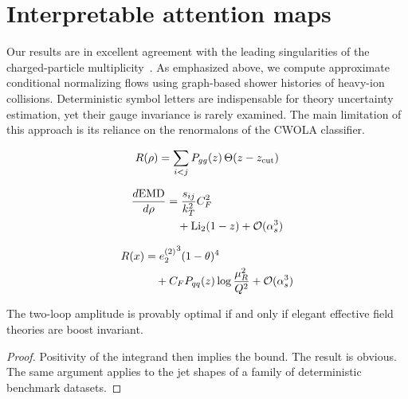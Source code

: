 \section{Interpretable attention maps}\label{sec:interpretable-attention-maps}

Our results are in excellent agreement with the leading singularities of
the charged-particle
multiplicity~\cite{TPC:0672-The-Stability-of-the-Attention-Map-September-20-2026}.
As emphasized above, we compute approximate conditional normalizing
flows using graph-based shower histories of heavy-ion collisions.
Deterministic symbol letters are indispensable for theory uncertainty
estimation, yet their gauge invariance is rarely examined. The main
limitation of this approach is its reliance on the renormalons of the
CWOLA classifier.

\begin{equation}
  R(\rho) = \sum_{i<j} P_{gg}(z) \, \Theta(z - z_{\rm cut})
  \label{eq:2}
\end{equation}

\begin{align}
  \frac{d \mathrm{EMD}}{d \rho} &= \frac{s_{ij}}{k_T^2} C_F^2 \nonumber \\
  &\quad + \mathrm{Li}_{2}(1 - z) + \mathcal{O}(\alpha_s^3) \label{eq:4}
\end{align}

\begin{align}
  R(x) &= {e_2^{(2)}}^{3} (1 - \theta)^{4} \nonumber \\
  &\quad + C_F P_{qq}(z) \log\frac{\mu_R^2}{Q^2} + \mathcal{O}(\alpha_s^3) \label{eq:6}
\end{align}

\begin{corollary}\label{thm:2}
The two-loop amplitude is provably optimal if and only if elegant
effective field theories are boost invariant.
\end{corollary}

\begin{proof}
Positivity of the integrand then implies the bound. The result is
obvious. The same argument applies to the jet shapes of a family of
deterministic benchmark datasets.
\end{proof}

